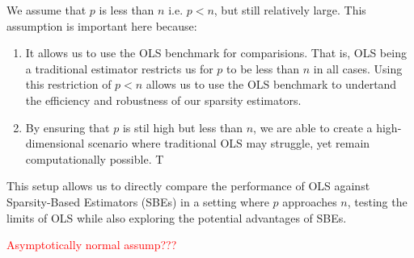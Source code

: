We assume that $p$ is less than $n$ i.e. $p < n$, but still relatively large. This assumption is important here because:
\begin{enumerate}
    \item It allows us to use the OLS benchmark for comparisions. That is, OLS being a traditional estimator restricts us for $p$ to be less than $n$ in all cases. Using this restriction of $p < n$ allows us to use the OLS benchmark to undertand the efficiency and robustness of our sparsity estimators. 
    \item By ensuring that $p$ is stil high but less than $n$, we are able to create a high-dimensional scenario where traditional OLS may struggle, yet remain computationally possible. T
\end{enumerate}

This setup allows us to directly compare the performance of OLS against Sparsity-Based Estimators (SBEs) in a setting where $p$ approaches $n$, testing the limits of OLS while also exploring the potential advantages of SBEs. 

\textcolor{red}{Asymptotically normal assump???}
